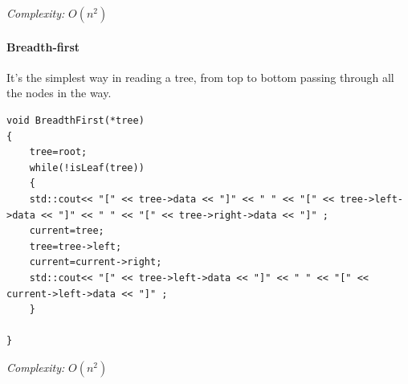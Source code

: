 \documentclass[10pt,a4paper]{article}
\begin{document}
\emph{Complexity:} $O(n^2)$


\paragraph{Breadth-first}
It's the simplest way in reading a tree, from top to bottom passing through all the nodes in the way.

\begin{lstlisting}
void BreadthFirst(*tree)
{
    tree=root;
    while(!isLeaf(tree))
    {
    std::cout<< "[" << tree->data << "]" << " " << "[" << tree->left->data << "]" << " " << "[" << tree->right->data << "]" ;
    current=tree;
    tree=tree->left;
    current=current->right;
    std::cout<< "[" << tree->left->data << "]" << " " << "[" << current->left->data << "]" ;
    }

}
\end{lstlisting}

\emph{Complexity:} $O(n^2)$



 
\end{document}
